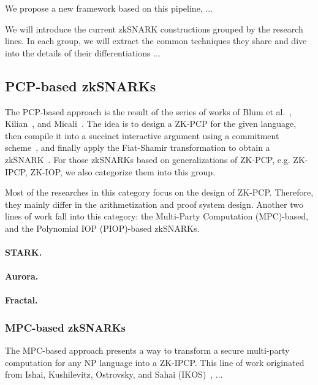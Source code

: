 \documentclass[acmtog]{acmart}
\begin{document}
We propose a new framework based on this pipeline, ...

We will introduce the current zkSNARK constructions grouped by the research lines.
In each group, we will extract the common techniques they share and dive into the details of their differentiations ...

\subsection{PCP-based zkSNARKs}
\label{sec:pcp.based}

The PCP-based approach is the result of the series of works of Blum et al.~\cite{BabaiFLS91}, Kilian~\cite{Kilian92}, and Micali~\cite{Micali00}.
The idea is to design a ZK-PCP for the given language, then compile it into a succinct interactive argument using a commitment scheme~\cite{Kilian92}, and finally apply the Fiat-Shamir transformation to obtain a zkSNARK~\cite{Micali00}.
For those zkSNARKs based on generalizations of ZK-PCP, e.g. ZK-IPCP, ZK-IOP, we also categorize them into this group.

Most of the researches in this category focus on the design of ZK-PCP.
Therefore, they mainly differ in the arithmetization and proof system design.
Another two lines of work fall into this category: the Multi-Party Computation (MPC)-based, and the Polynomial IOP (PIOP)-based zkSNARKs.

\paragraph{STARK.}

\paragraph{Aurora.}

\paragraph{Fractal.}

\subsubsection{MPC-based zkSNARKs}
\label{sec:mpc.based}

The MPC-based approach presents a way to transform a secure multi-party computation for any NP language into a ZK-IPCP.
This line of work originated from Ishai, Kushilevitz, Ostrovsky, and Sahai (IKOS)~\cite{IshaiKOS07}, ...
\end{document}
